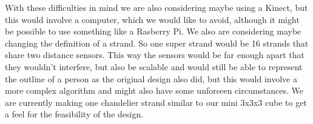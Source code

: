 \documentclass[10pt]{article}
\begin{document}
  With these difficulties in mind we are also considering maybe using a Kinect, but this would involve a computer, which we would like to avoid, although it might be possible to use something like a Rasberry Pi. We also are considering maybe changing the definition of a strand. So one super strand would be 16 strands that share two distance sensors. This way the sensors would be far enough apart that they wouldn't interfere, but also be scalable and would still be able to represent the outline of a person as the original design also did, but this would involve a more complex algorithm and might also have some unforseen circumstances. We are currently making one chandelier strand similar to our mini 3x3x3 cube to get a feel for the feasibility of the design.
\end{document}
